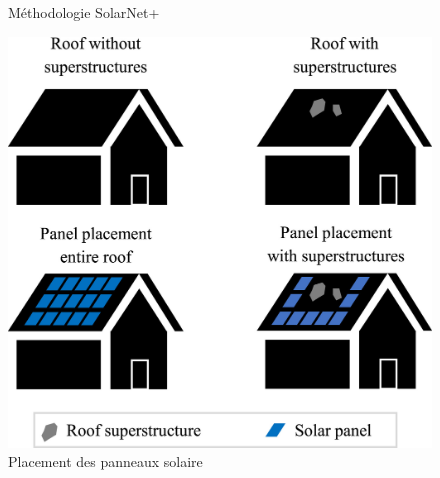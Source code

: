 {{{{\begin{figure}[H]
    \caption{Méthodologie SolarNet+ \cite{li_deep_2024}}
    \label{fig:solar_net_plus_methodo}
\end{figure}

\begin{figure}[H]
    \centering
    \includegraphics[width=0.5\linewidth]{02-main//figures/solar_net_plus_placement_pv.png}
    \caption{Placement des panneaux solaire \cite{li_deep_2024}}
    \label{fig:solar_net_plus_placement_pv}
\end{figure}

}}}}
